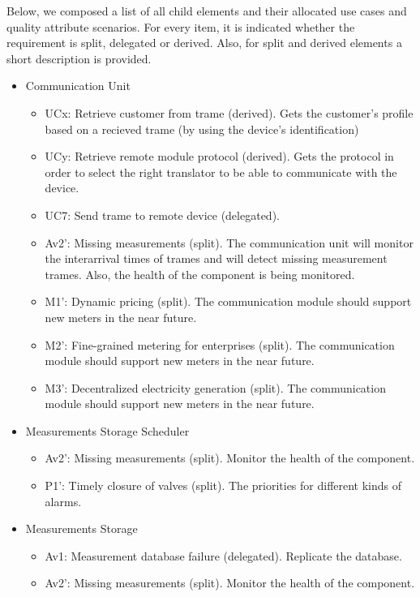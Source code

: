 \npar Below, we composed a list of all child elements and their allocated use
cases and quality attribute scenarios. For every item, it is indicated whether
the requirement is split, delegated or derived. Also, for split and derived
elements a short description is provided.

\begin{itemize}
	\item Communication Unit
	\begin{itemize}
	  	\item UCx: Retrieve customer from trame (derived). Gets the customer's
	  	profile based on a recieved trame (by using the device's identification)
	  	\item UCy: Retrieve remote module protocol (derived). Gets the protocol in
	  	order to select the right translator to be able to communicate with the device. 
		\item UC7: Send trame to remote device (delegated). 
		\item Av2': Missing measurements (split). The communication unit will monitor
		the interarrival times of trames and will detect missing measurement trames.
		Also, the health of the component is being monitored.
		\item M1': Dynamic pricing (split). The communication module should support
		new meters in the near future. 
		\item M2': Fine-grained metering for enterprises (split). The communication
		module should support new meters in the near future. 
		\item M3': Decentralized electricity generation (split). The communication
		module should support new meters in the near future.
	\end{itemize}
	\item Measurements Storage Scheduler
	\begin{itemize}
		\item Av2': Missing measurements (split). Monitor the health of the component.
		\item P1': Timely closure of valves (split). The priorities for different
		kinds of alarms.
	\end{itemize}
	\item Measurements Storage
	\begin{itemize}
		\item Av1: Measurement database failure (delegated). Replicate the database.
		\item Av2': Missing measurements (split). Monitor the health of the component.

\end{itemize}
\end{itemize}
